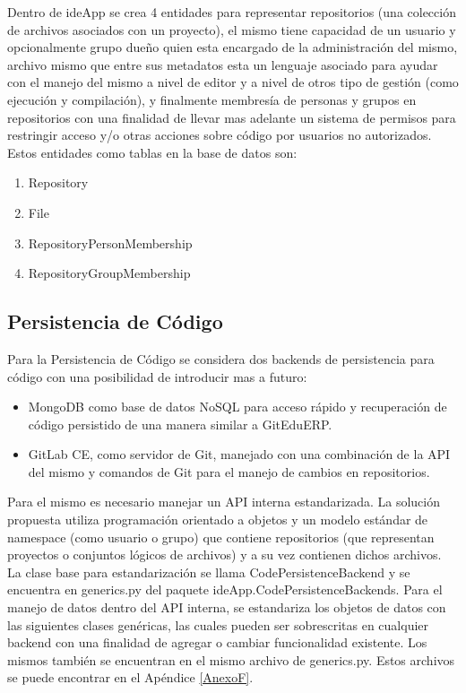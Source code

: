Dentro de ideApp se crea 4 entidades para representar repositorios (una colección de archivos asociados con un proyecto), el mismo tiene capacidad de un usuario y opcionalmente grupo dueño quien esta encargado de la administración del mismo, archivo mismo que entre sus metadatos esta un lenguaje asociado para ayudar con el manejo del mismo a nivel de editor y a nivel de otros tipo de gestión (como ejecución y compilación), y finalmente membresía de personas y grupos en repositorios con una finalidad de llevar mas adelante un sistema de permisos para restringir acceso y/o otras acciones sobre código por usuarios no autorizados. Estos entidades como tablas en la base de datos son:
\begin{enumerate}
\item Repository
\item File
\item RepositoryPersonMembership
\item RepositoryGroupMembership
\end{enumerate}

\subsection{Persistencia de Código}
Para la Persistencia de Código se considera dos backends de persistencia para código con una posibilidad de introducir mas a futuro:
\begin{itemize}
	\item MongoDB como base de datos NoSQL para acceso rápido y recuperación de código persistido de una manera similar a GitEduERP.
    \item GitLab CE, como servidor de Git, manejado con una combinación de la API del mismo y comandos de Git para el manejo de cambios en repositorios.
\end{itemize}

Para el mismo es necesario manejar un API interna estandarizada. La solución propuesta utiliza programación orientado a objetos y un modelo estándar de namespace (como usuario o grupo) que contiene repositorios (que representan proyectos o conjuntos lógicos de archivos) y a su vez contienen dichos archivos. La clase base para estandarización se llama CodePersistenceBackend y se encuentra en generics.py del paquete ideApp.CodePersistenceBackends. Para el manejo de datos dentro del API interna, se estandariza los objetos de datos con las siguientes clases genéricas, las cuales pueden ser sobrescritas en cualquier backend con una finalidad de agregar o cambiar funcionalidad existente. Los mismos también se encuentran en el mismo archivo de generics.py. Estos archivos se puede encontrar en el Apéndice \ref{AnexoF}.

